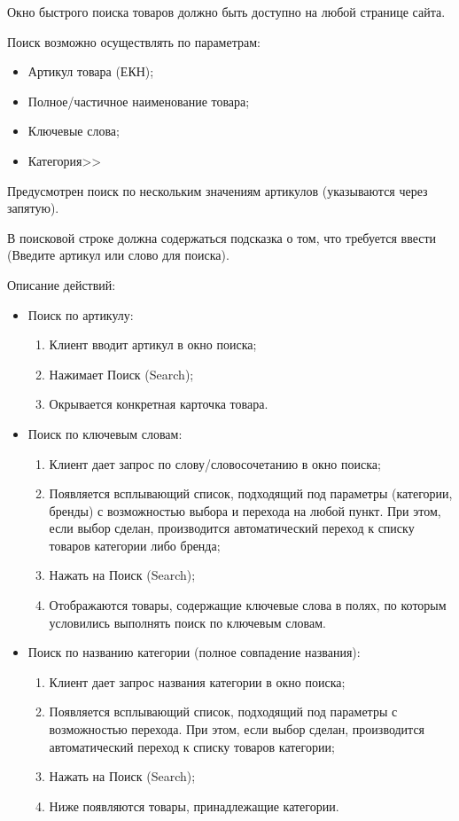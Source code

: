 {

\begin{itogolong}
Окно быстрого поиска товаров должно быть доступно на любой странице сайта.

Поиск возможно осуществлять по параметрам:
\begin{itemize}
	\item Артикул товара (ЕКН);
	\item Полное/частичное наименование товара;
	\item Ключевые слова;
	\item Категория>>
\end{itemize}

Предусмотрен поиск по нескольким значениям артикулов (указываются через запятую).

В поисковой строке должна содержаться подсказка о том, что требуется ввести (Введите артикул или слово для поиска).

Описание действий:
\begin{itemize}

\item Поиск по артикулу:
	\begin{enumerate} 
		\item Клиент вводит артикул в окно поиска;
		\item Нажимает Поиск (Search);
		\item Окрывается конкретная карточка товара.
	\end{enumerate}	
	
\item Поиск по ключевым словам:
 	\begin{enumerate} 
	 	\item Клиент дает запрос по слову/словосочетанию в окно поиска;
		\item Появляется всплывающий список, подходящий под параметры (категории, бренды) с возможностью выбора и перехода на любой пункт. При этом, если выбор сделан, производится автоматический переход к списку товаров категории либо бренда;
		\item Нажать на Поиск (Search);
		\item Отображаются товары, содержащие ключевые слова в полях, по которым условились выполнять поиск по ключевым словам.
	\end{enumerate}
	
\item Поиск по названию категории (полное совпадение названия):
 	\begin{enumerate} 
 		\item Клиент дает запрос названия категории в окно поиска;
		\item	Появляется всплывающий список, подходящий под параметры с возможностью перехода. При этом, если выбор сделан, производится автоматический переход к списку товаров категории;
		\item	Нажать на Поиск (Search);
		\item	Ниже появляются товары, принадлежащие категории.
	\end{enumerate}	
		

\end{itemize}
\end{itogolong}}
